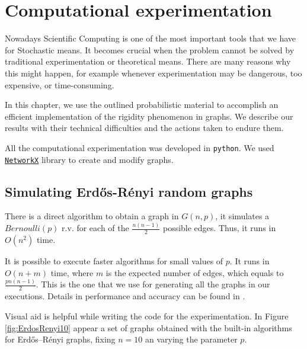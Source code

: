 
\chapter{Computational experimentation} %

\label{Chapter3} %



Nowadays Scientific Computing is one of the most important tools that we have for Stochastic means. It becomes crucial when the problem cannot be solved by traditional experimentation or theoretical means. There are many reasons why this might happen, for example whenever experimentation may be dangerous, too expensive, or time-consuming.

In this chapter, we use the outlined probabilistic material to accomplish an efficient implementation of the rigidity phenomenon in graphs. We describe our results with their technical difficulties and the actions taken to endure them.

All the computational experimentation was developed in \texttt{python}. We used \texttt{\href{https://networkx.github.io/}{NetworkX}} library to create and modify graphs.

\section{Simulating Erdős-Rényi random graphs}

There is a direct algorithm to obtain a graph in $G(n,p)$, it simulates a $Bernoulli(p)$ r.v. for each of the $\frac{n(n-1)}{2}$ possible edges. Thus, it runs in $O(n^2)$ time. 

It is possible to execute faster algorithms for small values of $p$. It runs in $O(n + m)$ time, where $m$ is the expected number of edges, which equals to $\frac{pn(n - 1)}{2}$. This is the one that we use for generating all the graphs in our executions. Details in performance and accuracy can be found in \cite[Batagelj, Brandes 05]{fastER}.

Visual aid is helpful while writing the code for the experimentation. In Figure \ref{fig:ErdosRenyi10} appear a set of graphs obtained with the built-in algorithms for Erdős–Rényi graphs, fixing $n=10$ an varying the parameter $p$.

